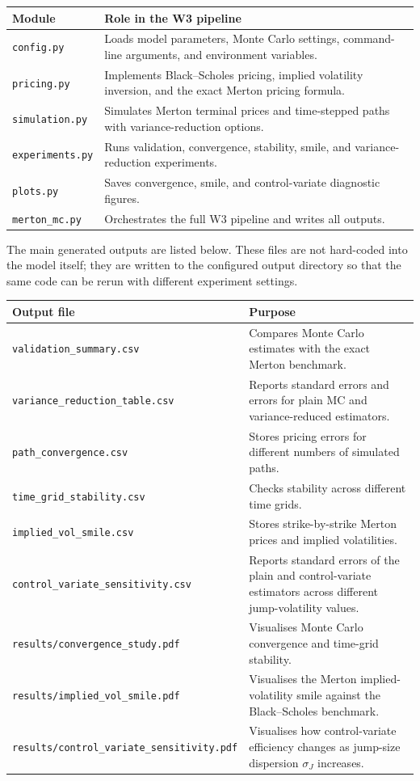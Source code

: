 \documentclass[12pt]{article}
\begin{document}
\begin{center}
\begin{tabular}{p{3.2cm}p{10.5cm}}
\toprule
Module & Role in the W3 pipeline \\
\midrule
\texttt{config.py} & Loads model parameters, Monte Carlo settings, command-line arguments, and environment variables. \\
\texttt{pricing.py} & Implements Black--Scholes pricing, implied volatility inversion, and the exact Merton pricing formula. \\
\texttt{simulation.py} & Simulates Merton terminal prices and time-stepped paths with variance-reduction options. \\
\texttt{experiments.py} & Runs validation, convergence, stability, smile, and variance-reduction experiments. \\
\texttt{plots.py} & Saves convergence, smile, and control-variate diagnostic figures. \\
\texttt{merton\_mc.py} & Orchestrates the full W3 pipeline and writes all outputs. \\
\bottomrule
\end{tabular}
\end{center}

The main generated outputs are listed below. These files are not hard-coded into the model itself; they are written to the configured output directory so that the same code can be rerun with different experiment settings.

\begin{center}
\begin{tabular}{p{6.8cm}p{7.0cm}}
\toprule
Output file & Purpose \\
\midrule
\texttt{validation\_summary.csv} & Compares Monte Carlo estimates with the exact Merton benchmark. \\
\texttt{variance\_reduction\_table.csv} & Reports standard errors and errors for plain MC and variance-reduced estimators. \\
\texttt{path\_convergence.csv} & Stores pricing errors for different numbers of simulated paths. \\
\texttt{time\_grid\_stability.csv} & Checks stability across different time grids. \\
\texttt{implied\_vol\_smile.csv} & Stores strike-by-strike Merton prices and implied volatilities. \\
\texttt{control\_variate\_sensitivity.csv} & Reports standard errors of the plain and control-variate estimators across different jump-volatility values. \\
\texttt{results/convergence\_study.pdf} & Visualises Monte Carlo convergence and time-grid stability. \\
\texttt{results/implied\_vol\_smile.pdf} & Visualises the Merton implied-volatility smile against the Black--Scholes benchmark. \\
\texttt{results/control\_variate\_sensitivity.pdf} & Visualises how control-variate efficiency changes as jump-size dispersion $\sigma_J$ increases. \\
\bottomrule
\end{tabular}
\end{center}
\end{document}
